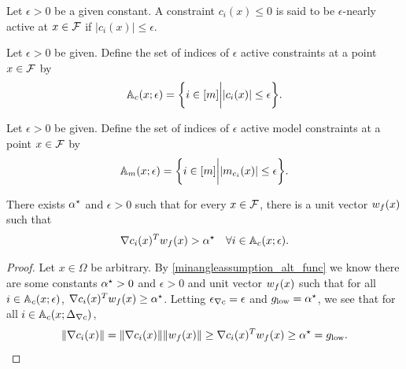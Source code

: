 \begin{definition}
Let $\epsilon > 0$ be a given constant.
A constraint $c_i(x) \le 0$ is said to be $\epsilon$-nearly active at $x \in {\mathcal F}$ if $|c_i(x)| \le \epsilon$.
\end{definition}

\begin{definition}
Let $\epsilon > 0$ be given.
Define the set of indices of $\epsilon$ active constraints at a point $x \in {\mathcal F}$ by
\begin{align}
{\mathbb A_c}(x; \epsilon) = \bigg\{ i \in [m] \bigg | |c_i(x)| \le \epsilon \bigg\}. \label{define_epsactive}
\end{align}
\end{definition}

\begin{definition}
Let $\epsilon > 0$ be given.
Define the set of indices of $\epsilon$ active model constraints at a point $x \in {\mathcal F}$ by
\begin{align}
{\mathbb A_{m}}(x; \epsilon) = \bigg\{ i \in [m] \bigg | |m_{c_i}(x)| \le \epsilon  \bigg\}. \label{define_epsactivemodels}
\end{align}
\end{definition}

\begin{assumption}
\label{minangleassumption_alt_func}
There exists ${ \alpha^{\star} }$ and $\epsilon > 0$ such that for every $x \in {\mathcal F}$, 
there is a unit vector ${w_f}(x)$ such that
\begin{align*}
\nabla c_i(x)^T{w_f}(x) > { \alpha^{\star} }\quad \forall i \in {\mathbb A_c}(x; \epsilon).
\end{align*}
\end{assumption}


\begin{proof}
Let $x \in \Omega$ be arbitrary.
By \cref{minangleassumption_alt_func} we know there are some constants ${ \alpha^{\star} }>0$ and $\epsilon>0$ and unit vector ${w_f}(x)$
such that for all $i \in {\mathbb A_c}(x; \epsilon)$,
$\nabla c_i(x)^T{w_f}(x) \ge { \alpha^{\star} }$.
Letting ${\epsilon_{\nabla c}} = \epsilon$ and ${ g_{\textrm{low}} } = { \alpha^{\star} }$, we see that for all $i \in {\mathbb A_c}(x; {\Delta_{\nabla c}})$,
\begin{align*}
\|\nabla c_i(x)\| = \|\nabla c_i(x)\| \|{w_f}(x)\| \ge \nabla c_i(x)^T{w_f}(x) \ge { \alpha^{\star} } = { g_{\textrm{low}} }.
\end{align*}
\end{proof}

